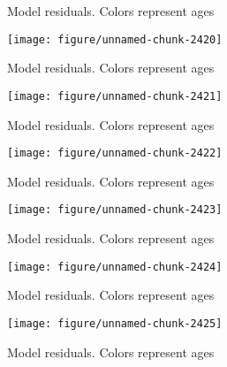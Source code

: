 \documentclass[a4paper]{article}\usepackage{graphicx, color}
\makeatletter
\def\maxwidth{ %
  \ifdim\Gin@nat@width>\linewidth
    \linewidth
  \else
    \Gin@nat@width
  \fi
}
\newenvironment{knitrout}{}{} %
\makeatother
\begin{document}
\begin{knitrout}
\begin{figure}[H]
\caption[Model residuals]{Model residuals. Colors represent ages\label{fig:unnamed-chunk-2419}}
\end{figure}
\begin{figure}[H]


{\centering \texttt{[image: figure/unnamed-chunk-2420]} 

}

\caption[Model residuals]{Model residuals. Colors represent ages\label{fig:unnamed-chunk-2420}}
\end{figure}
\begin{figure}[H]


{\centering \texttt{[image: figure/unnamed-chunk-2421]} 

}

\caption[Model residuals]{Model residuals. Colors represent ages\label{fig:unnamed-chunk-2421}}
\end{figure}
\begin{figure}[H]


{\centering \texttt{[image: figure/unnamed-chunk-2422]} 

}

\caption[Model residuals]{Model residuals. Colors represent ages\label{fig:unnamed-chunk-2422}}
\end{figure}
\begin{figure}[H]


{\centering \texttt{[image: figure/unnamed-chunk-2423]} 

}

\caption[Model residuals]{Model residuals. Colors represent ages\label{fig:unnamed-chunk-2423}}
\end{figure}
\begin{figure}[H]


{\centering \texttt{[image: figure/unnamed-chunk-2424]} 

}

\caption[Model residuals]{Model residuals. Colors represent ages\label{fig:unnamed-chunk-2424}}
\end{figure}
\begin{figure}[H]


{\centering \texttt{[image: figure/unnamed-chunk-2425]} 

}

\caption[Model residuals]{Model residuals. Colors represent ages\label{fig:unnamed-chunk-2425}}
\end{figure}
\begin{figure}[H]



\end{figure}
\end{knitrout}
\end{document}
